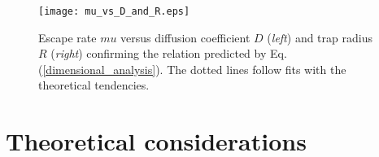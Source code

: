 \documentclass{article}
\begin{document}
\begin{figure}
  \centering
  \texttt{[image: mu\_vs\_D\_and\_R.eps]}
  \caption{\label{mu_vs_D_and_R}Escape rate $mu$ versus diffusion coefficient
           $D$ (\textit{left}) and trap radius $R$ (\textit{right}) confirming
           the relation predicted by Eq. (\ref{dimensional_analysis}). The
           dotted lines follow fits with the theoretical tendencies.}
\end{figure}

\section{Theoretical considerations}



\end{document}
